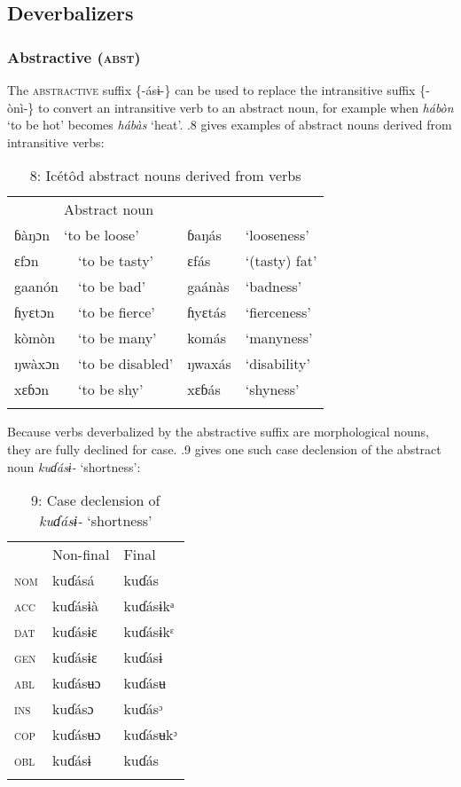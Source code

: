 \subsection{Deverbalizers}
\subsubsection{Abstractive (\textsc{abst})}

The \textsc{abstractive} suffix \{-ásɨ-\} can be used to replace the intransitive suffix \{-ònì-\} to convert an intransitive verb to an abstract noun, for example when \textit{hábòn} ‘to be hot’ becomes \textit{hábàs} ‘heat’. .8 gives examples of abstract nouns derived from intransitive verbs:


\begin{table}
\caption{8: Icétôd abstract nouns derived from verbs}
\label{tab:8}


\begin{tabularx}{\textwidth}{XXXXX}
\lsptoprule

\multicolumn{3}{X}{Intransitive infinitive} & \multicolumn{2}{X}{Abstract noun}\\
ɓàŋɔn & \multicolumn{2}{X}{ ‘to be loose’} & ɓaŋás & ‘looseness’\\
\multicolumn{2}{X}{ɛfɔn} & ‘to be tasty’ & ɛfás & ‘(tasty) fat’\\
\multicolumn{2}{X}{gaanón} & ‘to be bad’ & gaánàs & ‘badness’\\
\multicolumn{2}{X}{ɦyɛtɔn} & ‘to be fierce’ & ɦyɛtás & ‘fierceness’\\
\multicolumn{2}{X}{kòmòn} & ‘to be many’ & komás & ‘manyness’\\
\multicolumn{2}{X}{ŋwàxɔn} & ‘to be disabled’ & ŋwaxás & ‘disability’\\
\multicolumn{2}{X}{xɛɓɔn} & ‘to be shy’ & xɛɓás & ‘shyness’\\
\lspbottomrule
\end{tabularx}
\end{table}
Because verbs deverbalized by the abstractive suffix are morphological nouns, they are fully declined for case. .9 gives one such case declension of the abstract noun \textit{kuɗásɨ-} ‘shortness’:


\begin{table}
\caption{9: Case declension of \textit{kuɗásɨ-} ‘shortness’}
\label{tab:8}


\begin{tabularx}{\textwidth}{XXX} & Non-final & Final\\
\lsptoprule
\textsc{nom} & kuɗásá & kuɗás\\
\textsc{acc} & kuɗásɨà & kuɗásɨkᵃ\\
\textsc{dat} & kuɗásɨɛ & kuɗásɨkᵋ\\
\textsc{gen} & kuɗásɨɛ & kuɗásɨ\\
\textsc{abl} & kuɗásʉɔ & kuɗásʉ\\
\textsc{ins} & kuɗásɔ & kuɗásᵓ\\
\textsc{cop} & kuɗásʉɔ & kuɗásʉkᵓ\\
\textsc{obl} & kuɗásɨ & kuɗás\\
\lspbottomrule
\end{tabularx}
\end{table}

